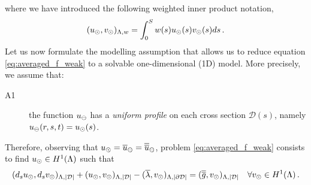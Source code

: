 \documentclass[r]{siamart171218}
\begin{document}
where we have introduced the following weighted inner product notation,
\begin{equation*}
(u_{\odot},v_{\odot})_{\Lambda,w} = \int_0^S w(s) u_{\odot}(s) v_{\odot}(s) ds\,.
\end{equation*}
Let us now formulate the modelling assumption that allows us to reduce equation \eqref{eq:averaged_f_weak} to a solvable one-dimensional (1D) model.
More precisely, we assume that:
\begin{description}
\item[A1] the function $u_{\ominus}$ has a \emph{uniform profile} on each cross section $\mathcal{D}(s)$, namely $u_{\ominus}(r,s,t) = u_{\odot}(s)$.
\end{description}
Therefore, observing that $u_{\odot}=\overline{u}_{\ominus}=\overline{\overline{u}}_{\ominus}$, problem \eqref{eq:averaged_f_weak} consists to find $u_{\odot} \in H^1(\Lambda)$ such that
\begin{equation}\label{eq:1Ddirneu_weak}
 (d_s \ud, d_s \vd)_{\Lambda,|\mathcal{D}|} 
+(\ud, \vd)_{\Lambda, |\D|}
-(\avrc{\lambda},\vd)_{\Lambda, |\DD|}
=  (\avrd{g},\vd)_{\Lambda, |\mathcal{D}|}
\quad \forall \vd \in H^1(\Lambda)\,.
\end{equation}

\end{document}
